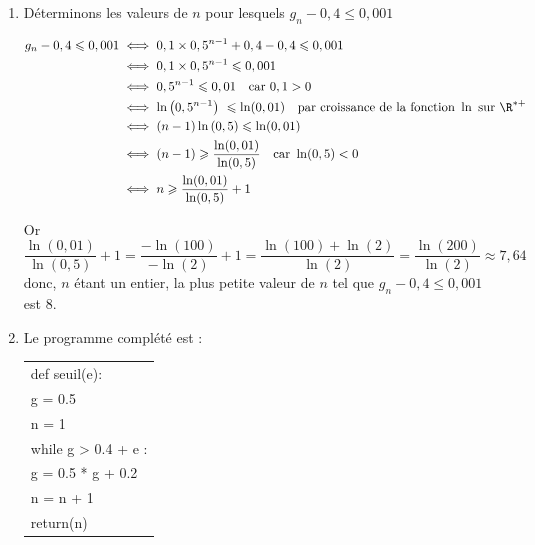 \begin{enumerate}
	Sur le long terme, Léa gagnera son match dans 40\,\% des cas.
	\item  Déterminons les valeurs de $n$ pour lesquels  $g_n-0,4\leqslant 0,001$

	$\aligned g_n-0,4\leqslant 0,001 & \iff 0,1 \times 0,5^{n-1}+0,4 -0,4 \leqslant 0,001 \\
	&\iff 0,1 \times 0,5^{n-1} \leqslant 0,001 \\
		&\iff 0,5^{n-1} \leqslant 0,01 \quad \text {car } 0,1>0\\
	&\iff \ln\left( 0,5^{n-1} \right)\ \leqslant \ln(0,01) \quad \text{par croissance de la fonction } \ln \text{ sur }\R^{*+}\\
	&\iff(n-1) \ln\left( 0,5 \right) \leqslant \ln(0,01) \\
	&\iff(n-1) \geqslant \dfrac{\ln(0,01)}{\ln(0,5)} \quad \text {car } \ln(0,5)<0\\
	&\iff n \geqslant \dfrac{\ln(0,01)}{\ln(0,5)} +1 	\endaligned$


	Or  $\dfrac{\ln(0,01)}{\ln(0,5)} +1 = \dfrac{-\ln(100)}{-\ln(2)} + 1 = \dfrac{\ln(100)+ \ln(2)}{\ln(2)} = \dfrac{\ln(200)}{\ln(2)} \approx 7,64$ donc, $n$ étant un entier, la plus petite valeur de $n$ tel que $g_n-0,4\leqslant 0,001$ est 8.

	\item Le programme complété est :

	\begin{center}
		\ttfamily
		\begin{tabularx}{10cm}{|X|}\hline
			def seuil(e):\\
			\quad g = 0.5\\
			\quad n = 1\\
			\quad while {g \red > 0.4 + e} :\\
			\quad \quad g =  0.5 * g + 0.2\\
			\quad \quad n = {\red n + 1}\\
			\quad return(n)\\ \hline
		\end{tabularx}
	\end{center}
\end{enumerate}

